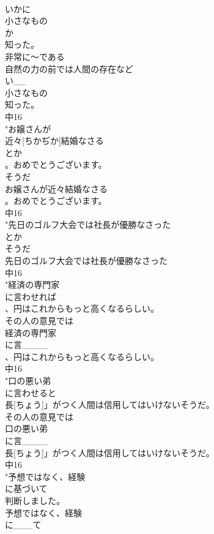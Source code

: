 \documentclass[8pt]{extreport}
\begin{document}
\begin{CJK}{UTF8}{min}
\\	いかに
\\	小さなもの
\\	か
\\	知った。
\\	非常に～である 
\\	自然の力の前では人間の存在など
\\	い__
\\	小さなもの
\\	知った。
\\	中16
\\	"お嬢さんが
\\	近々[ちかぢか]結婚なさる
\\	とか
\\	。おめでとうございます。
\\	そうだ	
\\	お嬢さんが近々結婚なさる
\\	。おめでとうございます。
\\	中16
\\	"先日のゴルフ大会では社長が優勝なさった
\\	とか
\\	そうだ	
\\	先日のゴルフ大会では社長が優勝なさった
\\	中16
\\	"経済の専門家
\\	に言わせれば
\\	、円はこれからもっと高くなるらしい。
\\	その人の意見では　
\\	経済の専門家
\\	に言____
\\	、円はこれからもっと高くなるらしい。
\\	中16
\\	"口の悪い弟
\\	に言わせると
\\	長[ちょう]」がつく人間は信用してはいけないそうだ。
\\	その人の意見では　
\\	口の悪い弟
\\	に言____
\\	長[ちょう]」がつく人間は信用してはいけないそうだ。
\\	中16
\\	"予想ではなく、経験
\\	に基づいて
\\	判断しました。
\\	予想ではなく、経験
\\	に___て

\end{CJK}
\end{document}

